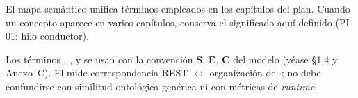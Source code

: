 El mapa semántico unifica términos empleados en los capítulos del plan. Cuando un concepto aparece
en varios capítulos, conserva el significado aquí definido (PI-01: hilo conductor).



Los términos \SemanticScore{}, \StructuralScore{}, \CoverageScore{} y \AlignmentScore{} se usan
con la convención \textbf{S}, \textbf{E}, \textbf{C} del modelo (véase §1.4 y Anexo~C). El
\StructuralScore{} mide correspondencia REST $\leftrightarrow$ organización del \ServiceDomain{};
no debe confundirse con similitud ontológica genérica ni con métricas de \textit{runtime}.
